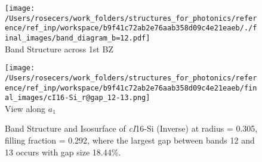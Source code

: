 \begin{figure}[H]
\begin{minipage}{0.5\textwidth}\centering
\texttt{[image: /Users/rosecers/work\_folders/structures\_for\_photonics/reference/ref\_inp/workspace/b9f41c72ab2e76aab358d09c4e21eaeb/./final\_images/band\_diagram\_b=12.pdf]}
\\Band Structure across 1st BZ
\end{minipage}\hfill
\begin{minipage}{0.48\textwidth}\centering
\texttt{[image: /Users/rosecers/work\_folders/structures\_for\_photonics/reference/ref\_inp/workspace/b9f41c72ab2e76aab358d09c4e21eaeb/final\_images/cI16-Si\_r@gap\_12-13.png]}
\\View along $a_1$ 
\end{minipage}\hfill\caption{Band Structure and Isosurface of \textit{cI}16-Si (Inverse) at radius = 0.305, filling fraction = 0.292, where the largest gap between bands 12 and 13 occurs with gap size 18.44\%.}

\end{figure}
\vspace{-0.25in}

